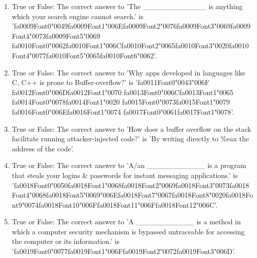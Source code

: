 \documentclass[12pt]{article}
\begin{document}
\begin{enumerate}[label=\arabic*.]
\item True or False: The correct answer to 'The \_\_\_\_\_\_\_\_\_\_\_\_ is anything which your search engine cannot search.' is '{\csname fa0009Font0\endcsname\char"0049}{\csname fa0009Font1\endcsname\char"006E}{\csname fa0009Font2\endcsname\char"0076}{\csname fa0009Font3\endcsname\char"0069}{\csname fa0009Font4\endcsname\char"0073}{\csname fa0009Font5\endcsname\char"0069} {\csname fa0010Font0\endcsname\char"0062}{\csname fa0010Font1\endcsname\char"006C}{\csname fa0010Font2\endcsname\char"0065}{\csname fa0010Font3\endcsname\char"0020}{\csname fa0010Font4\endcsname\char"0077}{\csname fa0010Font5\endcsname\char"0065}{\csname fa0010Font6\endcsname\char"0062}'.
\item True or False: The correct answer to 'Why apps developed in languages like C, C++ is prone to Buffer-overflow?' is '{\csname fa0011Font0\endcsname\char"0043}{\char"006F} {\csname fa0012Font0\endcsname\char"006D}{\csname fa0012Font1\endcsname\char"0070} {\csname fa0013Font0\endcsname\char"006C}{\csname fa0013Font1\endcsname\char"0065} {\csname fa0014Font0\endcsname\char"0078}{\csname fa0014Font1\endcsname\char"0020} {\csname fa0015Font0\endcsname\char"0073}{\csname fa0015Font1\endcsname\char"0079} {\csname fa0016Font0\endcsname\char"006E}{\csname fa0016Font1\endcsname\char"0074} {\csname fa0017Font0\endcsname\char"0061}{\csname fa0017Font1\endcsname\char"0078}'.
\item True or False: The correct answer to 'How does a buffer overflow on the stack facilitate running attacker-injected code?' is 'By writing directly to \%eax the address of the code'.
\item True or False: The correct answer to 'A/an \_\_\_\_\_\_\_\_\_\_\_ is a program that steals your logins \& passwords for instant messaging applications.' is '{\csname fa0018Font0\endcsname\char"0050}{\csname fa0018Font1\endcsname\char"0068}{\csname fa0018Font2\endcsname\char"0069}{\csname fa0018Font3\endcsname\char"0073}{\csname fa0018Font4\endcsname\char"0068}{\csname fa0018Font5\endcsname\char"0069}{\char"006E}{\csname fa0018Font7\endcsname\char"0067}{\csname fa0018Font8\endcsname\char"0020}{\csname fa0018Font9\endcsname\char"0074}{\csname fa0018Font10\endcsname\char"006F}{\csname fa0018Font11\endcsname\char"006F}{\csname fa0018Font12\endcsname\char"006C}'.
\item True or False: The correct answer to 'A \_\_\_\_\_\_\_\_\_\_\_ is a method in which a computer security mechanism is bypassed untraceable for accessing the computer or its information.' is '{\csname fa0019Font0\endcsname\char"0077}{\csname fa0019Font1\endcsname\char"006F}{\csname fa0019Font2\endcsname\char"0072}{\csname fa0019Font3\endcsname\char"006D}'.

\end{enumerate}
\end{document}
